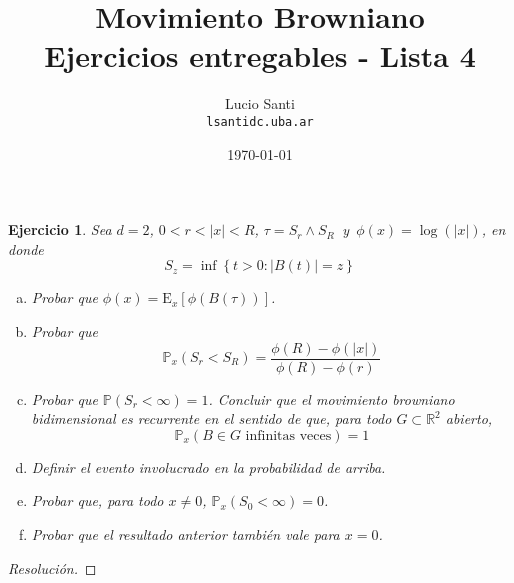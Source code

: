 \documentclass[a4paper,11pt]{article}
\title{Movimiento Browniano\\
      \small{Ejercicios entregables - Lista 4}}
\author{Lucio Santi\\
        \texttt{lsanti\at dc.uba.ar}}
\date{\today}
\newcommand{\abs}[1]{\ensuremath{\left\lvert #1 \right\rvert}}
\newcommand{\Prob}[1]{\ensuremath{\mathbb{P} \left( #1 \right)}}
\newcommand{\Probx}[2]{\ensuremath{\mathbb{P}_{#1} \left( #2 \right)}}
\newcommand{\Expx}[2]{\ensuremath{\textrm{E}_{#1}\left[#2\right]}}
\newtheorem*{ej}{Ejercicio}
\begin{document}
\maketitle

\begin{ej} 
Sea $d = 2$, $0 < r < \abs{x} < R$, $\tau = S_r \wedge S_R \,$ y $\, \phi(x) = \log(\abs{x})$,
en donde
$$S_z = \inf \left\{ t > 0 : \abs{B(t)} = z \right\}$$
\begin{enumerate}[a.]
    \item Probar que $\phi(x) = \Expx{x}{\phi(B(\tau))}$.

    \item Probar que
    $$\Probx{x}{S_r < S_R} = \frac{\phi(R) - \phi(\abs{x})}{\phi(R) - \phi(r)}$$

    \item Probar que $\Prob{S_r < \infty} = 1$. Concluir que el movimiento browniano
    bidimensional es recurrente en el sentido de que, para todo
    $G \subset \mathbb{R}^2$ abierto,
    $$\Probx{x}{B \in G \textrm{ infinitas veces}} = 1$$

    \item Definir el evento involucrado en la probabilidad de arriba.

    \item Probar que, para todo $x \neq 0$, $\Probx{x}{S_0 < \infty} = 0$.

    \item Probar que el resultado anterior también vale para $x = 0$.
\end{enumerate}
\end{ej}

\begin{proof}[Resoluci\'on]

\end{proof}
\end{document}

